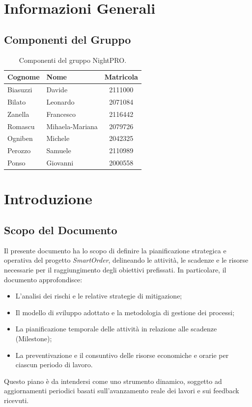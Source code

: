 \documentclass[a4paper, 11pt, oneside]{scrartcl} %
\begin{document}
\section*{Informazioni Generali}

\subsection*{Componenti del Gruppo}

\begin{table}[h!]
\centering
\renewcommand{\arraystretch}{1.2} 
\begin{tabular}{@{}llc@{}}
\toprule
\textbf{Cognome} & \textbf{Nome} & \textbf{Matricola} \\
\midrule
Biasuzzi & Davide & 2111000 \\
Bilato & Leonardo & 2071084 \\
Zanella & Francesco & 2116442 \\
Romascu & Mihaela-Mariana & 2079726 \\
Ogniben & Michele & 2042325 \\
Perozzo & Samuele & 2110989 \\
Ponso & Giovanni & 2000558 \\
\bottomrule
\end{tabular}
\caption{Componenti del gruppo NightPRO.}
\end{table}

\newpage
\section{Introduzione}

\subsection{Scopo del Documento}
Il presente documento ha lo scopo di definire la pianificazione strategica e operativa del progetto \textit{SmartOrder}, delineando le attività, le scadenze e le risorse necessarie per il raggiungimento degli obiettivi prefissati. 
In particolare, il documento approfondisce:
\begin{itemize}
    \item L'analisi dei rischi e le relative strategie di mitigazione{\scriptsize{}};
    \item Il modello di sviluppo adottato{\scriptsize{}} e la metodologia di gestione dei processi;
    \item La pianificazione temporale delle attività in relazione alle scadenze (Milestone{\scriptsize{}});
    \item La preventivazione e il consuntivo{\scriptsize{}} delle risorse economiche e orarie per ciascun periodo di lavoro.
\end{itemize}
Questo piano è da intendersi come uno strumento dinamico, soggetto ad aggiornamenti periodici basati sull'avanzamento reale dei lavori e sui feedback ricevuti.
\end{document}
